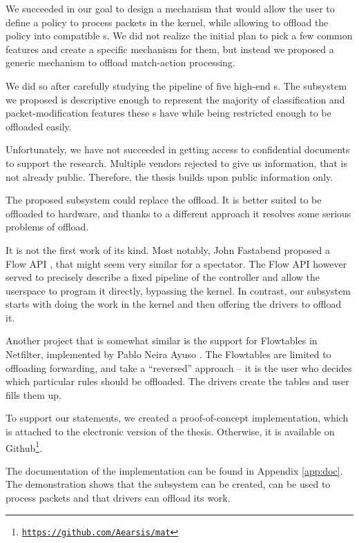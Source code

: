 

We succeeded in our goal to design a mechanism that would allow the user to
define a policy to process packets in the kernel, while allowing to offload the
policy into compatible s. We did not realize the initial plan to pick
a few common features and create a specific mechanism for them, but instead we
proposed a generic mechanism to offload match-action processing.

We did so after carefully studying the pipeline of five high-end s.
The subsystem we proposed is descriptive enough to represent the majority of
classification and packet-modification features these s have while
being restricted enough to be offloaded easily.

Unfortunately, we have not succeeded in getting access to confidential
documents to support the research. Multiple vendors rejected to give us
information, that is not already public. Therefore, the thesis builds upon
public information only.

The proposed subsystem could replace the  offload. It is better suited to be
offloaded to hardware, and thanks to a different approach it resolves some
serious problems of  offload.

It is not the first work of its kind. Most notably, John Fastabend proposed
a Flow API \cite{flow-api}, that might seem very similar for a spectator. The
Flow API however served to precisely describe a fixed pipeline of the
controller and allow the userspace to program it directly, bypassing the
kernel. In contrast, our subsystem starts with doing the work in the kernel and
then offering the drivers to offload it.

Another project that is somewhat similar is the support for Flowtables in
Netfilter, implemented by Pablo Neira Ayuso \cite{flowtables}. The Flowtables
are limited to offloading forwarding, and take a ``reversed'' approach -- it is
the user who decides which particular rules should be offloaded. The drivers
create the tables and user fills them up.

To support our statements, we created a proof-of-concept implementation, which
is attached to the electronic version of the thesis. Otherwise, it is available
on Github\footnote{\href{https://github.com/Aearsis/mat}{\texttt{https://github.com/Aearsis/mat}}}.

The documentation of the implementation can be found in Appendix
\ref{app:doc}. The demonstration shows that the subsystem can be created, can
be used to process packets and that drivers can offload its work.


